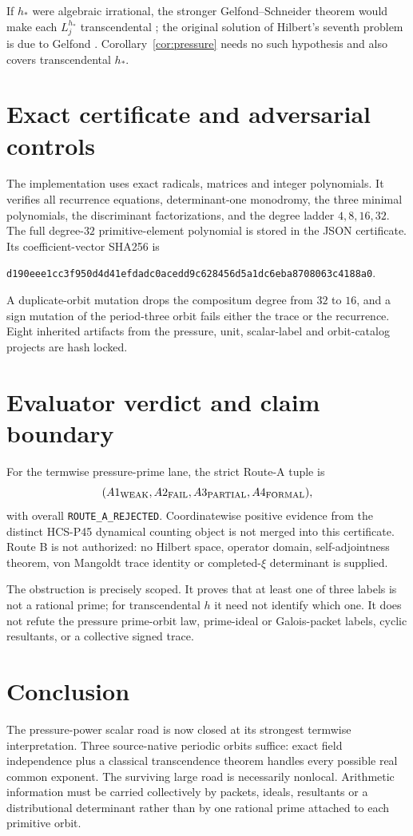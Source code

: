 \documentclass[11pt]{article}
\theoremstyle{remark}\newtheorem{remark}[theorem]{Remark}
\begin{document}
If $h_*$ were algebraic irrational, the stronger Gelfond--Schneider theorem
would make each $L_j^{h_*}$ transcendental \cite[Theorem~3.2]{Pila}; the
original solution of Hilbert's seventh problem is due to Gelfond
\cite{Gelfond}.  Corollary~\ref{cor:pressure} needs no such hypothesis and
also covers transcendental $h_*$.

\section{Exact certificate and adversarial controls}
The implementation uses exact radicals, matrices and integer polynomials.
It verifies all recurrence equations, determinant-one monodromy, the three
minimal polynomials, the discriminant factorizations, and the degree ladder
$4,8,16,32$.  The full degree-$32$ primitive-element polynomial is stored in
the JSON certificate.  Its coefficient-vector SHA256 is
\begin{center}
\small\texttt{d190eee1cc3f950d4d41efdadc0acedd9c628456d5a1dc6eba8708063c4188a0}.
\end{center}
A duplicate-orbit mutation drops the compositum degree from $32$ to $16$,
and a sign mutation of the period-three orbit fails either the trace or the
recurrence.  Eight inherited artifacts from the pressure, unit, scalar-label
and orbit-catalog projects are hash locked.

\section{Evaluator verdict and claim boundary}
For the termwise pressure-prime lane, the strict Route-A tuple is
\[
(A1_{\rm WEAK},A2_{\rm FAIL},A3_{\rm PARTIAL},A4_{\rm FORMAL}),
\]
with overall \texttt{ROUTE\_A\_REJECTED}.  Coordinatewise positive evidence
from the distinct HCS-P45 dynamical counting object is not merged into this
certificate.  Route B is not authorized: no Hilbert space, operator domain,
self-adjointness theorem, von Mangoldt trace identity or completed-$\xi$
determinant is supplied.

The obstruction is precisely scoped.  It proves that at least one of three
labels is not a rational prime; for transcendental $h$ it need not identify
which one.  It does not refute the pressure prime-orbit law, prime-ideal or
Galois-packet labels, cyclic resultants, or a collective signed trace.

\section{Conclusion}
The pressure-power scalar road is now closed at its strongest termwise
interpretation.  Three source-native periodic orbits suffice: exact field
independence plus a classical transcendence theorem handles every possible
real common exponent.  The surviving large road is necessarily nonlocal.
Arithmetic information must be carried collectively by packets, ideals,
resultants or a distributional determinant rather than by one rational prime
attached to each primitive orbit.
\end{document}
